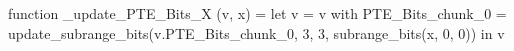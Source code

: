 function _update_PTE_Bits_X (v, x) = let v = { v with PTE_Bits_chunk_0 = update_subrange_bits(v.PTE_Bits_chunk_0, 3, 3, subrange_bits(x, 0, 0)) } in
  v
